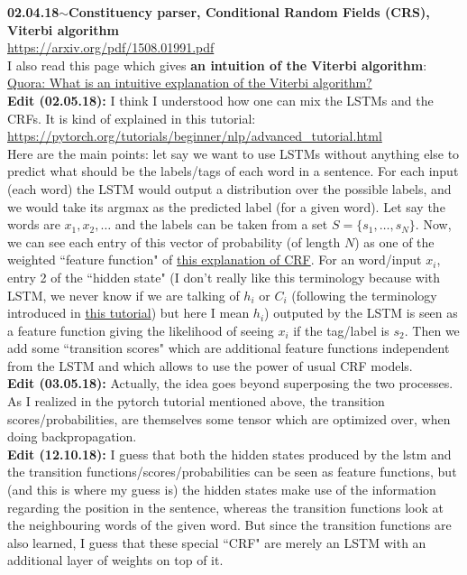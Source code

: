 \documentclass[11pt,a4paper]{article}
\newenvironment{loggentry}[2]%
{\noindent\textbf{#1}\hspace{1cm}$\mathbf{\sim}$\text{ }\textbf{#2}\\}{\vspace{0.5cm}}
\begin{document}
\begin{loggentry}{02.04.18}{Constituency parser, Conditional Random Fields (CRS), Viterbi algorithm}
\url{https://arxiv.org/pdf/1508.01991.pdf}\\
I also read this page which gives \textbf{an intuition of the Viterbi algorithm}:\\
\href{https://www.quora.com/What-is-an-intuitive-explanation-of-the-Viterbi-algorithm}{Quora: What is an intuitive explanation of the Viterbi algorithm?}\\
\textbf{Edit (02.05.18):} I think I understood how one can mix the LSTMs and the CRFs. It is kind of explained in this tutorial:\\
\url{https://pytorch.org/tutorials/beginner/nlp/advanced_tutorial.html}\\
Here are the main points: let say we want to use LSTMs without anything else to predict what should be the labels/tags of each word in a sentence. For each input (each word) the LSTM would output a distribution over the possible labels, and we would take its argmax as the predicted label (for a given word). Let say the words are $x_1, x_2,\dots$ and the labels can be taken from a set $S = \lbrace s_1,\dots, s_N \rbrace$. Now, we can see each entry of this vector of probability (of length $N$) as one of the weighted ``feature function" of \href{http://blog.echen.me/2012/01/03/introduction-to-conditional-random-fields/}{this explanation of CRF}. For an word/input $x_i$, entry 2 of the ``hidden state" (I don't really like this terminology because with LSTM, we never know if we are talking of $h_i$ or $C_i$ (following the terminology introduced in \href{https://colah.github.io/posts/2015-08-Understanding-LSTMs/}{this tutorial}) but here I mean $h_i$) outputed by the LSTM is seen as a feature function giving the likelihood of seeing $x_i$ if the tag/label is $s_2$. Then we add some ``transition scores" which are additional feature functions independent from the LSTM and which allows to use the power of usual CRF models.\\
\textbf{Edit (03.05.18):} Actually, the idea goes beyond superposing the two processes. As I realized in the pytorch tutorial mentioned above, the transition scores/probabilities, are themselves some tensor which are optimized over, when doing backpropagation.\\
\textbf{Edit (12.10.18):} I guess that both the hidden states produced by the lstm and the transition functions/scores/probabilities can be seen as feature functions, but (and this is where my guess is) the hidden states make use of the information regarding the position in the sentence, whereas the transition functions look at the neighbouring words of the given word. But since the transition functions are also learned, I guess that these special ``CRF" are merely an LSTM with an additional layer of weights on top of it.\\

\end{loggentry}
\end{document}
